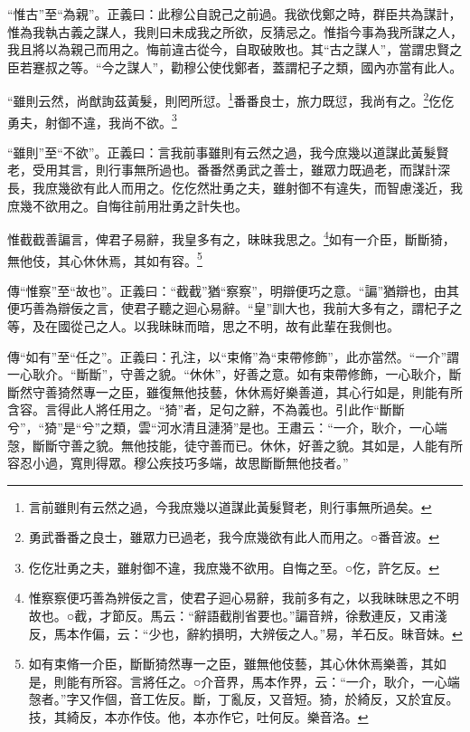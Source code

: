 {\noindent\shu{}\fzkt “惟古”至“為親”。正義曰：此穆公自說己之前過。我欲伐鄭之時，群臣共為謀計，惟為我執古義之謀人，我則曰未成我之所欲，反猜忌之。惟指今事為我所謀之人，我且將以為親己而用之。悔前違古從今，自取破敗也。其“古之謀人”，當謂忠賢之臣若蹇叔之等。“今之謀人”，勸穆公使伐鄭者，蓋謂杞子之類，國內亦當有此人。 \par}

“雖則云然，尚猷詢茲黃髮，則罔所愆。\footnote{言前雖則有云然之過，今我庶幾以道謀此黃髮賢老，則行事無所過矣。}番番良士，旅力既愆，我尚有之。\footnote{勇武番番之良士，雖眾力已過老，我今庶幾欲有此人而用之。○番音波。}仡仡勇夫，射御不違，我尚不欲。\footnote{仡仡壯勇之夫，雖射御不違，我庶幾不欲用。自悔之至。○仡，許乞反。}


{\noindent\shu{}\fzkt “雖則”至“不欲”。正義曰：言我前事雖則有云然之過，我今庶幾以道謀此黃髮賢老，受用其言，則行事無所過也。番番然勇武之善士，雖眾力既過老，而謀計深長，我庶幾欲有此人而用之。仡仡然壯勇之夫，雖射御不有違失，而智慮淺近，我庶幾不欲用之。自悔往前用壯勇之計失也。 \par}

惟截截善諞言，俾君子易辭，我皇多有之，昧昧我思之。\footnote{惟察察便巧善為辨佞之言，使君子迴心易辭，我前多有之，以我昧昧思之不明故也。○截，才節反。馬云：“辭語截削省要也。”諞音辨，徐敷連反，又甫淺反，馬本作偏，云：“少也，辭約損明，大辨佞之人。”易，羊石反。昧音妹。}如有一介臣，斷斷猗，無他伎，其心休休焉，其如有容。\footnote{如有束脩一介臣，斷斷猗然專一之臣，雖無他伎藝，其心休休焉樂善，其如是，則能有所容。言將任之。○介音界，馬本作界，云：“一介，耿介，一心端愨者。”字又作個，音工佐反。斷，丁亂反，又音短。猗，於綺反，又於宜反。技，其綺反，本亦作伎。他，本亦作它，吐何反。樂音洛。}


{\noindent\zhuan{}\fzbyks 傳“惟察”至“故也”。正義曰：“截截”猶“察察”，明辯便巧之意。“諞”猶辯也，由其便巧善為辯佞之言，使君子聽之迴心易辭。“皇”訓大也，我前大多有之，謂杞子之等，及在國從己之人。以我昧昧而暗，思之不明，故有此輩在我側也。 \par}

{\noindent\zhuan{}\fzbyks 傳“如有”至“任之”。正義曰：孔注，以“束脩”為“束帶修飾”，此亦當然。“一介”謂一心耿介。“斷斷”，守善之貌。“休休”，好善之意。如有束帶修飾，一心耿介，斷斷然守善猗然專一之臣，雖復無他技藝，休休焉好樂善道，其心行如是，則能有所含容。言得此人將任用之。“猗”者，足句之辭，不為義也。引此作“斷斷兮”，“猗”是“兮”之類，雲“河水清且漣漪”是也。王肅云：“一介，耿介，一心端愨，斷斷守善之貌。無他技能，徒守善而已。休休，好善之貌。其如是，人能有所容忍小過，寬則得眾。穆公疾技巧多端，故思斷斷無他技者。” \par}

